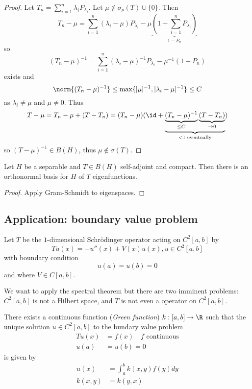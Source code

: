 \documentclass[a4paper]{article}
\begin{document}
\begin{proof}
  Let \(T_n = \sum_{i = 1}^n \lambda_iP_{\lambda_i}\). Let \(\mu \notin \sigma_p(T) \cup \{0\}\). Then
  \[
    T_n - \mu
    = \sum_{i = 1}^n (\lambda_i - \mu) P_{\lambda_i} - \mu \underbrace{(1 - \sum_{i = 1}^n P_{\lambda_i})}_{1 - P_n}
  \]
  so
  \[
    (T_n - \mu)^{-1} = \sum_{i = 1}^n (\lambda_i - \mu)^{-1} P_{\lambda_i} - \mu^{-1} (1 - P_n)
  \]
  exists and
  \[
    \norm{(T_n - \mu)^{-1}} \leq \max \{|\mu|^{-1}, |\lambda_i - \mu|^{-1}\} \leq C
  \]
  as \(\lambda_i \neq \mu\) and \(\mu \neq 0\). Thus
  \[
    T - \mu
    = T_n - \mu + (T - T_n)
    = (T_n - \mu) (\id + \underbrace{\underbrace{(T_n - \mu)^{-1}}_{\leq C} \underbrace{(T - T_n)}_{\to 0}}_{< 1 \text{ eventually}})
  \]
  so \((T - \mu)^{-1} \in B(H)\), thus \(\mu \notin \sigma(T)\).
\end{proof}

\begin{corollary}
  Let \(H\) be a separable and \(T \in B(H)\) self-adjoint and compact. Then there is an orthonormal basis for \(H\) of \(T\) eigenfunctions.
\end{corollary}

\begin{proof}
  Apply Gram-Schmidt to eigenspaces.
\end{proof}

\subsection{Application: boundary value problem}

Let \(T\) be the \(1\)-dimensional Schrödinger operator acting on \(C^2[a, b]\) by
\[
  Tu(x) = -u''(x) + V(x) u(x), u \in C^2[a, b]
\]
with boundary condition
\[
  u(a) = u(b) = 0
\]
and where \(V \in C[a, b]\).

We want to apply the spectral theorem but there are two imminent problems: \(C^2[a, b]\) is not a Hilbert space, and \(T\) is not even a operator on \(C^2[a, b]\).

\begin{theorem}
  There exists a continuous function (\emph{Green function}) \(k: [a, b] \to \R\) such that the unique solution \(u \in C^2[a, b]\) to the bundary value problem
  \begin{align*}
    Tu(x) &= f(x) \quad f \text{ continuous} \\
    u(a) &= u(b) = 0
  \end{align*}
  is given by
  \begin{align*}
    u(x) &= \int_a^b k(x, y)f(y) dy \\
    k(x, y) &= k(y, x)
  \end{align*}
\end{theorem}
\end{document}
